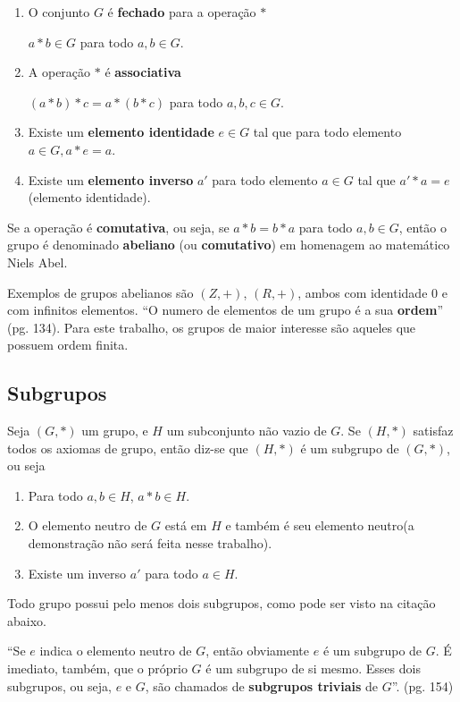 \begin{enumerate}
\item O conjunto \(G\) é \textbf{fechado} para a operação \(*\)

$a * b \in G$ para todo $a,b \in G$.

\item A operação $*$ é \textbf{associativa}

$(a * b) * c = a * (b * c)$ para todo $a,b,c \in G$.

\item Existe um \textbf{elemento identidade} $e \in G$ tal que para todo elemento $a \in G, a * e = a$.
\item Existe um \textbf{elemento inverso} \(a'\) para todo elemento $a \in G$ tal que $a' * a = e$ (elemento identidade).
\end{enumerate}

Se a operação é \textbf{comutativa}, ou seja, se $a * b = b * a$ para todo $a, b \in G$, então o grupo é denominado \textbf{abeliano} (ou \textbf{comutativo}) em homenagem ao matemático Niels Abel. \cite{Gilbert:2004}

Exemplos de grupos abelianos são $(Z, +)$, $(R, +)$, ambos com identidade 0 e com infinitos elementos. ``O numero de elementos de um grupo é a sua \textbf{ordem}'' \cite{Coutinho:2014} (pg. 134). Para este trabalho, os grupos de maior interesse são aqueles que possuem ordem finita.

\subsection{Subgrupos}
Seja $(G, *)$ um grupo, e \(H\) um subconjunto não vazio de \(G\). Se $(H, *)$ satisfaz todos os axiomas de grupo, então diz-se que $(H, *)$ é um subgrupo de $(G, *)$\cite{Coutinho:2014}, ou seja

\begin{enumerate}
\item Para todo $a, b \in H$, $a * b \in H$.
\item O elemento neutro de \(G\) está em \(H\) e também é seu elemento neutro(a demonstração não será feita nesse trabalho).
\item Existe um inverso \(a'\) para todo $a \in H$.
\end{enumerate}

Todo grupo possui pelo menos dois subgrupos, como pode ser visto na citação abaixo.


\begin{citacao}
``Se \(e\) indica o elemento neutro de \(G\), então obviamente \(e\) é um subgrupo de \(G\). É imediato, também, que o próprio \(G\) é um subgrupo de si mesmo. Esses dois subgrupos, ou seja, \(e\) e \(G\), são chamados de \textbf{subgrupos triviais} de \(G\)''. \cite{Domingues:2003} (pg. 154)
\end{citacao}

